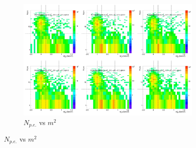 \begin{figure}[H]
  \centering
    \begin{subfigure}{1\textwidth}
    \includegraphics[width=1\textwidth]{hiptfits/neg/PSaccthreshold_cent0_ich0_accfire0_ptbin10.jpg}
    \caption{$N_{p.e.}$ vs $m^2$}
    \end{subfigure}
\end{figure}
